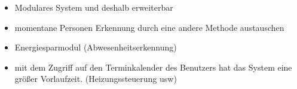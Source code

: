 \begin{itemize}
	\item Modulares System und deshalb erweiterbar
	\item momentane Personen Erkennung durch eine andere Methode austauschen
	\item Energiesparmodul (Abwesenheitserkennung)
	\item mit dem Zugriff auf den Terminkalender des Benutzers hat das System eine größer Vorlaufzeit.
				(Heizungssteuerung usw)
\end{itemize} 
 

